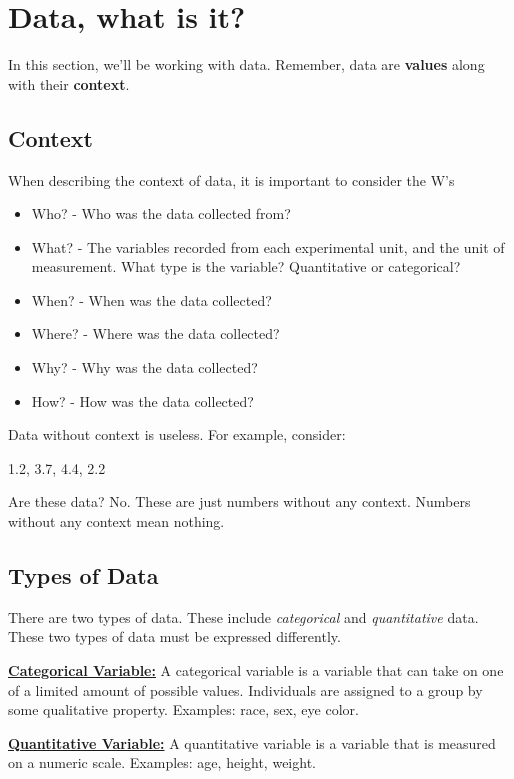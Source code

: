 \section{Data, what is it?}
In this section, we'll be working with data. Remember, data are \textbf{values}
along with their \textbf{context}.

\subsection{Context}
When describing the context of data, it is important to consider the W's
\begin{itemize}
  \item Who? - Who was the data collected from? 
  \item What? - The variables recorded from each experimental unit, and the unit of measurement.
What type is the variable? Quantitative or categorical?
  \item When? - When was the data collected?
  \item Where? - Where was the data collected?
  \item Why? - Why was the data collected?
  \item How? - How was the data collected?
\end{itemize}
Data without context is useless. For example, consider:
\begin{center}
  1.2, 3.7, 4.4, 2.2
\end{center}
Are these data? No. These are just numbers without any context. Numbers without any context mean nothing.

\subsection{Types of Data}
There are two types of data. These include \emph{categorical} and \emph{quantitative} data.
These two types of data must be expressed differently.

\begin{mdframed}
  \begin{definition}{\textbf{\underline{Categorical Variable:}}}
    A categorical variable is a variable that can take on one of a limited amount
  of possible values. Individuals are assigned to a group by some qualitative property.
  Examples: race, sex, eye color.
  \end{definition}
\end{mdframed}

\begin{mdframed}
  \begin{definition}{\textbf{\underline{Quantitative Variable:}}}
    A quantitative variable is a variable that is measured on a numeric scale.
    Examples: age, height, weight.
  \end{definition}
\end{mdframed}
